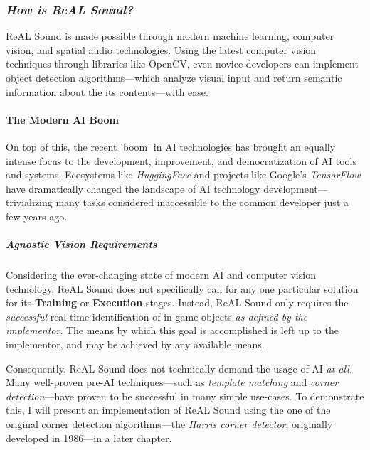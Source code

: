 \documentclass{report}
\newcommand{\rs}{ReAL Sound\xspace}
\begin{document}
\subsubsection{\emph{How is \rs?}}
\rs is made possible through modern machine learning, computer vision, and spatial audio technologies. Using the latest computer vision techniques through libraries like OpenCV\cite{opencv_library}, even novice developers can implement object detection algorithms---which analyze visual input and return semantic information about the its contents---with ease. 

\paragraph{The Modern AI Boom}

On top of this, the recent 'boom' in AI technologies\cite{Knight_2023}\cite{Meredith_2023} has brought an equally intense focus to the development, improvement, and democratization of AI tools and systems\cite{Brynjolfsson_McAfee_2017}\cite{Heikkilä_2022}. Ecosystems like \emph{HuggingFace}\cite{Wiggers_2022} and projects like Google's \emph{TensorFlow}\cite{tensorflow2015-whitepaper} have dramatically changed the landscape of AI technology development---trivializing many tasks considered inaccessible to the common developer just a few years ago.

\subparagraph{Agnostic Vision Requirements}

Considering the ever-changing state of modern AI and computer vision technology, \rs does not specifically call for any one particular solution for its \textbf{Training} or \textbf{Execution} stages. Instead, \rs only requires the \emph{successful} real-time identification of in-game objects \textit{as defined by the implementor}. The means by which this goal is accomplished is left up to the implementor, and may be achieved by any available means. 

Consequently, \rs does not technically demand the usage of AI \emph{at all.} Many well-proven pre-AI techniques---such as \emph{template matching}\cite{Brunelli2009-gh} and \emph{corner detection}\cite{Hildreth1980}---have proven to be successful in many simple use-cases. To demonstrate this, I will present an implementation of \rs using the one of the original corner detection algorithms---the \emph{Harris corner detector}\cite{Harris}, originally developed in 1986---in a later chapter. 
\end{document}
